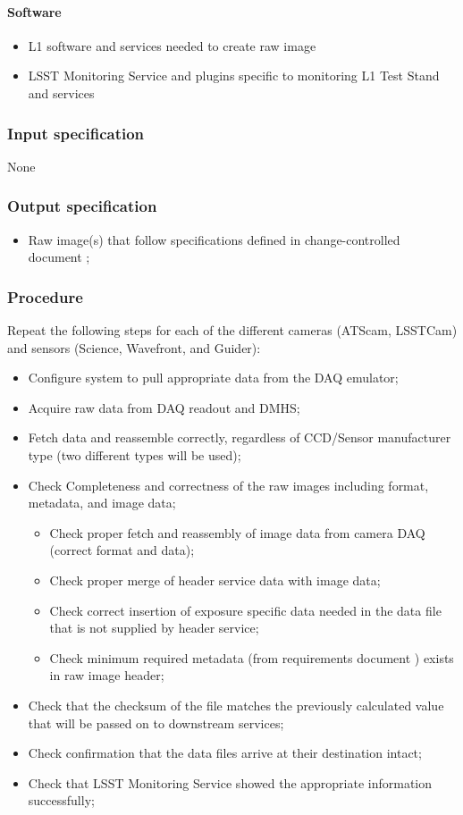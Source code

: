 \documentclass[DM,lsstdraft,STS,toc]{lsstdoc}
\begin{document}
\paragraph{Software}
\begin{itemize}
\item{L1 software and services needed to create raw image}
\item{LSST Monitoring Service and plugins specific to monitoring L1 Test Stand and services}
\end{itemize}


\subsubsection{Input specification}
None
\subsubsection{Output specification}
\begin{itemize}
\item{Raw image(s) that follow specifications defined in change-controlled document ;}
\end{itemize}


\subsubsection{Procedure}
Repeat the following steps for each of the different cameras (ATScam, LSSTCam) and sensors (Science, Wavefront, and Guider):
\begin{itemize}
\item{Configure system to pull appropriate data from the DAQ emulator;}
\item{Acquire raw data from DAQ readout and DMHS;}
\item{Fetch data and reassemble correctly, regardless of CCD/Sensor manufacturer type (two different types will be used);}
\item{Check Completeness and correctness of the raw images including format, metadata, and image data;}
\begin{itemize}
\item{Check proper fetch and reassembly of image data from camera DAQ (correct format and data);}
\item{Check proper merge of header service data with image data;}
\item{Check correct insertion of exposure specific data needed in the data file that is not supplied by header service;}
\item{Check minimum required metadata (from requirements document ) exists in raw image header;}
\end{itemize}
\item{Check that the checksum of the file matches the previously calculated value that will be passed on to downstream services;}
\item{Check confirmation that the data files arrive at their destination intact;}
\item{Check that LSST Monitoring Service showed the appropriate information successfully;}
\end{itemize}
\end{document}
